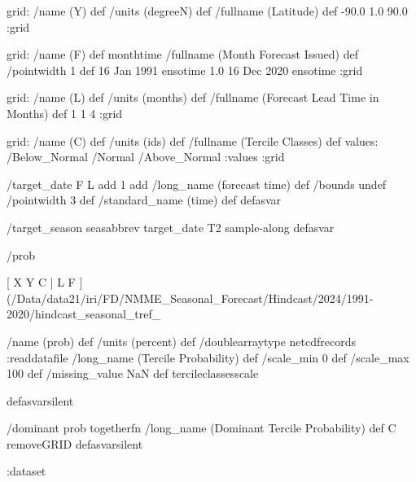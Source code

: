 \begin{ingrid}
grid:
/name (Y) def
/units (degreeN) def
/fullname (Latitude) def
-90.0 1.0 90.0
:grid

grid:
/name (F) def
monthtime
/fullname (Month Forecast Issued) def
/pointwidth 1 def
16 Jan 1991 ensotime
1.0
16 Dec 2020 ensotime
:grid

grid:
/name (L) def
/units (months) def
/fullname (Forecast Lead Time in Months) def
1 1 4
:grid

grid:
/name (C) def
/units (ids) def
/fullname (Tercile Classes) def
values: /Below_Normal /Normal /Above_Normal :values
:grid

/target_date { F L add 1 add /long_name (forecast time) def /bounds undef /pointwidth 3 def /standard_name (time) def } defasvar

/target_season { seasabbrev target_date T2 sample-along } defasvar

/prob {

[ X Y C | L F ] (/Data/data21/iri/FD/NMME_Seasonal_Forecast/Hindcast/2024/1991-2020/hindcast_seasonal_tref_%

/name (prob) def
/units (percent) def
/doublearraytype netcdfrecords :readdatafile
/long_name (Tercile Probability) def
/scale_min 0 def
/scale_max 100 def
/missing_value NaN def
tercileclassesscale
} defasvarsilent

/dominant {
prob togetherfn
/long_name (Dominant Tercile Probability) def
C removeGRID
} defasvarsilent

:dataset
\end{ingrid}

